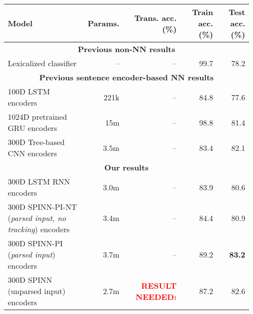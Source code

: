 \documentclass[11pt]{article}
\newcommand\result[1]{\textcolor{red}{\textbf{RESULT NEEDED:} #1}}
\def\ii#1{\textit{#1}}
\begin{document}
\begin{table*}[t]
  \centering\small
  \begin{tabular}{lrrrr} 
    \toprule
Model                   & Params.    & Trans. acc. (\%)  &   Train acc. (\%)  &   Test acc. (\%) \\
\midrule
\multicolumn{5}{c}{\textbf{Previous non-NN results}}\\
Lexicalized classifier \citep{snli:emnlp2015}
                        & --                & --                    &   99.7   &   78.2      \\
\midrule
\multicolumn{5}{c}{\textbf{Previous sentence encoder-based NN results}}\\
100D LSTM encoders \citep{snli:emnlp2015}
                        & 221k               & --               &   84.8   &   77.6      \\
1024D pretrained GRU encoders \citep{DBLP:journals/corr/VendrovKFU15}
                        & 15m                & --              &   98.8   &   81.4       \\
300D Tree-based CNN encoders \citep{mou2015recognizing}
                        & 3.5m                & --             &   83.4   &   82.1       \\
\midrule
\multicolumn{5}{c}{\textbf{Our results}}\\
300D LSTM RNN encoders         & 3.0m                  & --                &   83.9      &   80.6       \\
300D SPINN-PI-NT (\ii{parsed input, no tracking}) encoders
                        & 3.4m                  & --                &   84.4      &   80.9       \\
300D SPINN-PI (\ii{parsed input}) encoders
                        & 3.7m                  & --                &   89.2      &   \textbf{83.2}       \\
300D SPINN (unparsed input) encoders
                        & 2.7m                  & \result{}           &   87.2    &   82.6      \\          

\end{tabular}
\end{table*}
\end{document}
